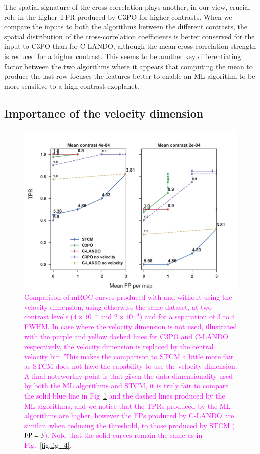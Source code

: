 \documentclass[referee]{aa} %
\newcommand{\newchange}[1]{\textcolor{magenta}{#1}}
\begin{document}
The spatial signature of the cross-correlation plays another, in our view, crucial role in the higher TPR produced by C3PO for higher contrasts.
When we compare the inputs to both the algorithms between the different contrasts, the spatial distribution of the cross-correlation coefficients is better conserved for the input to C3PO than for C-LANDO, although the mean cross-correlation strength is reduced for a higher contrast.
This seems to be another key differentiating factor between the two algorithms where it appears that computing the mean to produce the last row focuses the features better to enable an ML algorithm to be more sensitive to a high-contrast exoplanet.
\subsection{Importance of the velocity dimension}
\begin{figure}
    \centering
    \includegraphics[width=\textwidth]{Fig6_April2024_referee_final.png}
    \caption{\newchange{Comparison of mROC curves produced with and without using the velocity dimension, using otherwise the same dataset, at two contrast levels ($4\times 10^{-4}$ and $2\times 10^{-4}$) and for a separation of 3 to 4 FWHM. In case where the velocity dimension is not used, illustrated with the purple and yellow dashed lines for C3PO and C-LANDO respectively, the velocity dimension is replaced by the central velocity bin. This makes the comparison to STCM a little more fair as STCM does not have the capability to use the velocity dimension.
A final noteworthy point is that given the data dimensionality used by both the ML algorithms and STCM, it is truly fair to compare the solid blue line in Fig~\ref{fig:novel_roc} and the dashed lines produced by the ML algorithms, and we notice that the TPRs produced by the ML algorithms are higher, however the FPs produced by C-LANDO are similar, when reducing the threshold, to those produced by STCM (${\rm FP}=3$). 
    Note that the solid curves remain the same as in Fig.~\ref{fig:fig_4}.}
    }
    \label{fig:novel_roc}
\end{figure}
\end{document}
